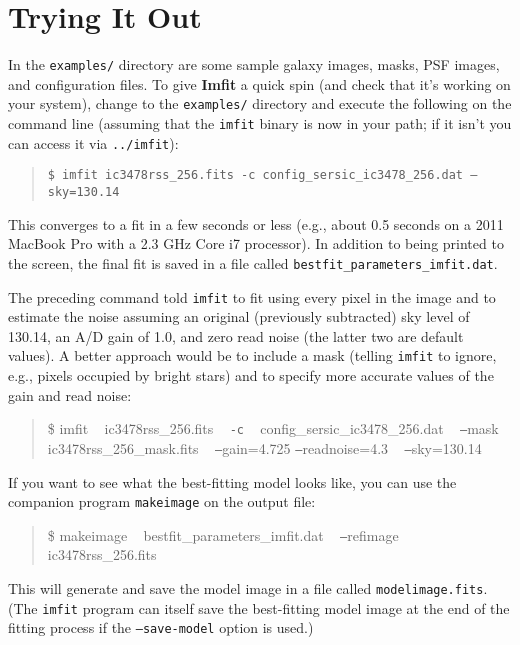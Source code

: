 \documentclass[10pt,a4paper,article]{memoir}
\newcommand{\imfit}{\textbf{Imfit}}
\newcommand{\imfitprog}{\texttt{imfit}}
\newcommand{\makeimage}{\texttt{makeimage}}
\begin{document}
\newpage

\chapter{Trying It Out}

In the \texttt{examples/} directory are some sample galaxy images, masks, PSF images, and
configuration files. To give \imfit{} a quick spin (and check that it's working on your system), change to the
\texttt{examples/} directory and execute the following on the command line (assuming that
the \imfitprog{} binary is now in your path; if it isn't you can access it via
\texttt{../imfit}):
\begin{quote}
\texttt{\$ imfit ic3478rss\_256.fits \texttt{-c} config\_sersic\_ic3478\_256.dat \texttt{--}sky=130.14}
\end{quote}

This converges to a fit in a few seconds or less (e.g., about 0.5 seconds on a 
2011 MacBook Pro with a 2.3 GHz Core i7 processor). In addition to being printed to
the screen, the final fit is saved in a file called \texttt{bestfit\_parameters\_imfit.dat}.

The preceding command told \imfitprog{} to fit using every pixel in the image and to estimate
the noise assuming an original (previously subtracted) sky level of 130.14, an A/D gain
of 1.0, and zero read noise (the latter two are default values). A better approach would be 
to include a mask (telling \imfitprog{}
to ignore, e.g., pixels occupied by bright stars) and to specify more accurate values
of the gain and read noise:
\begin{quote}
\$ imfit ~ ic3478rss\_256.fits ~ \texttt{-c} ~ config\_sersic\_ic3478\_256.dat ~ \texttt{--}mask ~ ic3478rss\_256\_mask.fits ~ \texttt{--}gain=4.725 \texttt{--}readnoise=4.3 ~ \texttt{--}sky=130.14
\end{quote}

If you want to see what the best-fitting model looks like, you can use the companion program \makeimage{}
on the output file:
\begin{quote}
\$ makeimage ~ bestfit\_parameters\_imfit.dat ~ \texttt{--}refimage ~ ic3478rss\_256.fits
\end{quote}
This will generate and save the model image in a file called \texttt{modelimage.fits}. (The \imfitprog{}
program 
can itself save the best-fitting model image at the end of the fitting process if
the \texttt{--save-model} option is used.)

\end{document}
